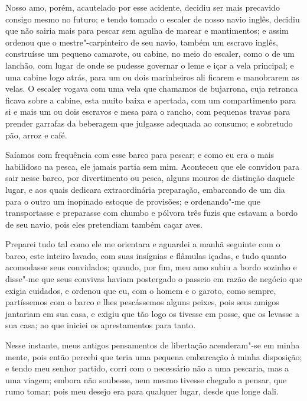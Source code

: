 Nosso amo, porém, acautelado por esse acidente, decidiu ser mais
precavido consigo mesmo no futuro; e tendo tomado o escaler de nosso
navio inglês, decidiu que não sairia mais para pescar sem agulha de
marear e mantimentos; e assim ordenou que o mestre"-carpinteiro de seu
navio, também um escravo inglês, construísse um pequeno camarote, ou
cabine, no meio do escaler, como o de um lanchão, com lugar de onde se
pudesse governar o leme e içar a vela principal; e uma cabine logo
atrás, para um ou dois marinheiros ali ficarem e manobrarem as velas. O
escaler vogava com uma vela que chamamos de bujarrona, cuja retranca
ficava sobre a cabine, esta muito baixa e apertada, com um compartimento
para si e mais um ou dois escravos e mesa para o rancho, com pequenas
travas para prender garrafas da beberagem que julgasse adequada ao
consumo; e sobretudo pão, arroz e café.

Saíamos com frequência com esse barco para pescar; e como eu era o mais
habilidoso na pesca, ele jamais partia sem mim. Aconteceu que ele
convidou para sair nesse barco, por divertimento ou pesca, alguns mouros
de distinção daquele lugar, e aos quais dedicara extraordinária
preparação, embarcando de um dia para o outro um inopinado estoque de
provisões; e ordenando"-me que transportasse e preparasse com chumbo e
pólvora três fuzis que estavam a bordo de seu navio, pois eles
pretendiam também caçar aves.

Preparei tudo tal como ele me orientara e aguardei a manhã seguinte com
o barco, este inteiro lavado, com suas insígnias e flâmulas içadas, e
tudo quanto acomodasse seus convidados; quando, por fim, meu amo subiu a
bordo sozinho e disse"-me que seus convivas haviam postergado o passeio
em razão de negócio que exigia cuidados, e ordenou que eu, com o homem e
o garoto, como sempre, partíssemos com o barco e lhes pescássemos alguns
peixes, pois seus amigos jantariam em sua casa, e exigiu que tão logo os
tivesse em posse, que os levasse a sua casa; ao que iniciei os
aprestamentos para tanto.

Nesse instante, meus antigos pensamentos de libertação acenderam"-se em
minha mente, pois então percebi que teria uma pequena embarcação à minha
disposição; e tendo meu senhor partido, corri com o necessário não a uma
pescaria, mas a uma viagem; embora não soubesse, nem mesmo tivesse
chegado a pensar, que rumo tomar; pois meu desejo era para qualquer
lugar, desde que longe dali.

